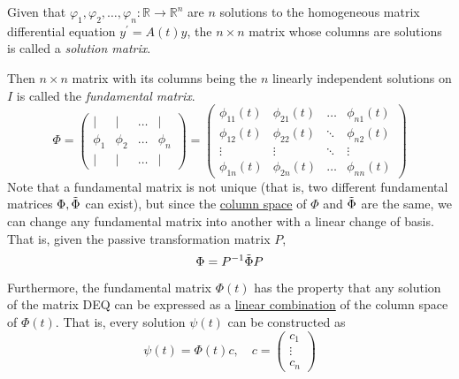 \documentclass{article}
\newcounter{definition}[section]
\begin{document}
      \begin{definition}
        \label{def:solution-matrix-fundamental-matrix}
      Given that $\varphi_1, \varphi_2, \ldots, \varphi_n: \mathbb{R} \to \mathbb{R}^n$ are $n$ solutions to the homogeneous matrix differential equation $y^\prime = A(t) y$, the $n \times n$ matrix whose columns are solutions is called a \textit{solution matrix}.

      Then $n \times n$ matrix with its columns being the $n$ linearly independent solutions on $I$ is called the \textit{fundamental matrix}. 
      \begin{equation}
        \Phi = \begin{pmatrix}
              | & | & \ldots & | \\
              \phi_1 & \phi_2 & \ldots & \phi_n \\
              | & | & \ldots & |
              \end{pmatrix} = \begin{pmatrix}
              \phi_{11}(t) & \phi_{21} (t) & \ldots & \phi_{n1} (t) \\
              \phi_{12} (t) & \phi_{22} (t) & \ddots & \phi_{n2} (t) \\
              \vdots & \vdots & \ddots & \vdots \\
              \phi_{1n} (t) & \phi_{2n} (t) & \ldots & \phi_{nn} (t)
              \end{pmatrix}
      \end{equation}
      Note that a fundamental matrix is not unique (that is, two different fundamental matrices $\Phi, \Tilde{\Phi}$ can exist), but since the \hyperref[lin-def:column-space]{column space} of $\Phi$ and $\Tilde{\Phi}$ are the same, we can change any fundamental matrix into another with a linear change of basis. That is, given the passive transformation matrix $P$, 
      \begin{equation}
        \Phi = P^{-1} \Tilde{\Phi} P
      \end{equation}
      Furthermore, the fundamental matrix $\Phi (t)$ has the property that any solution of the matrix DEQ can be expressed as a \hyperref[lin-def:linear-combination]{linear combination} of the column space of $\Phi(t)$. That is, every solution $\psi (t)$ can be constructed as
      \begin{equation}
        \psi (t) = \Phi (t) c, \quad c = \begin{pmatrix}
              c_1 \\ \vdots \\ c_n \end{pmatrix}
      \end{equation}
      \end{definition}
\end{document}
